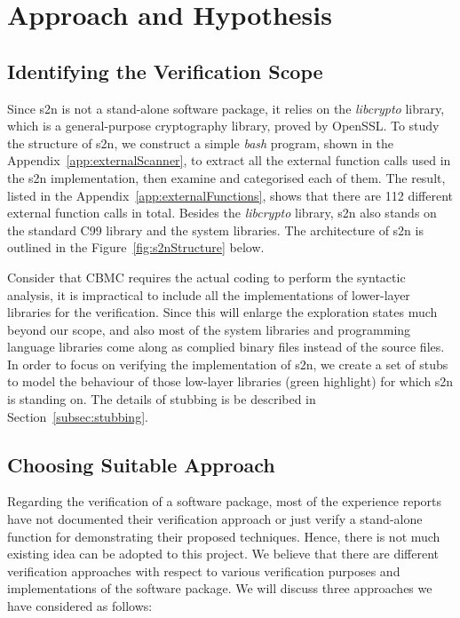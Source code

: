 \chapter{Approach and Hypothesis} %

\section{Identifying the Verification Scope}
Since s2n is not a stand-alone software package, it relies on the \textit{libcrypto} library, which is a general-purpose cryptography library, proved by OpenSSL. To study the structure of s2n, we construct a simple \textit{bash} program, shown in the Appendix~\ref{app:externalScanner}, to extract all the external function calls used in the s2n implementation, then examine and categorised each of them. The result, listed in the Appendix~\ref{app:externalFunctions}, shows that there are 112 different external function calls in total. Besides the \textit{libcrypto} library, s2n also stands on the standard C99 library and the system libraries. The architecture of s2n is outlined in the Figure~\ref{fig:s2nStructure} below.



Consider that CBMC requires the actual coding to perform the syntactic analysis, it is impractical to include all the implementations of lower-layer libraries for the verification. Since this will enlarge the exploration states much beyond our scope, and also most of the system libraries and programming language libraries come along as complied binary files instead of the source files. In order to focus on verifying the implementation of s2n, we create a set of stubs to model the behaviour of those low-layer libraries (green highlight) for which s2n is standing on. The details of stubbing is be described in Section~\ref{subsec:stubbing}. 

\section{Choosing Suitable Approach}
Regarding the verification of a software package, most of the experience reports have not documented their verification approach or just verify a stand-alone function for demonstrating their proposed techniques. Hence, there is not much existing idea can be adopted to this project. We believe that there are different verification approaches with respect to various verification purposes and implementations of the software package. We will discuss three approaches we have considered as follows:

